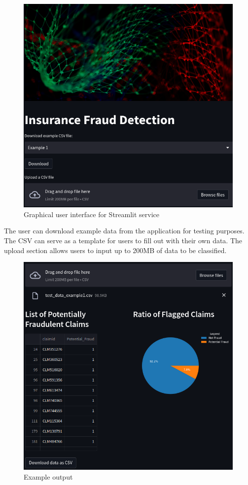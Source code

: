 \documentclass[twoside,11pt]{article}
\begin{document}
\begin{figure}[h]
  \centering
  \includegraphics[width=\textwidth]{./img/streamlit.png}
  \caption{Graphical user interface for Streamlit service}
\end{figure}
The user can download example data from the application for testing purposes.
The CSV can serve as a template for users to fill out with their own data. 
The upload section allows users to input up to 200MB of data to be classified.
\begin{figure}[!ht]
  \centering
  \includegraphics[width=\textwidth]{./img/streamlit2.png}
  \caption{Example output}
\end{figure}
\end{document}
